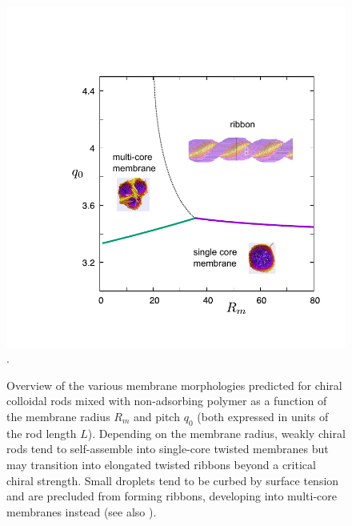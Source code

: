 \begin{figure}
\begin{center}
\includegraphics[width=  0.8 \columnwidth]{figures/chapter-5/emergent}.
\caption{ \label{emergent} Overview of the various membrane morphologies predicted for chiral colloidal rods mixed with non-adsorbing polymer as a function of the membrane radius $R_{m}$  and pitch $q_{0}$ (both expressed in units of the rod length $L$). Depending on the membrane radius,  weakly chiral rods tend to self-assemble into single-core twisted membranes but may transition into elongated twisted ribbons beyond a critical chiral strength. Small droplets tend to be curbed by surface tension and are precluded from forming ribbons,  developing into multi-core membranes instead (see also ).   }
\end{center}
\end{figure}


